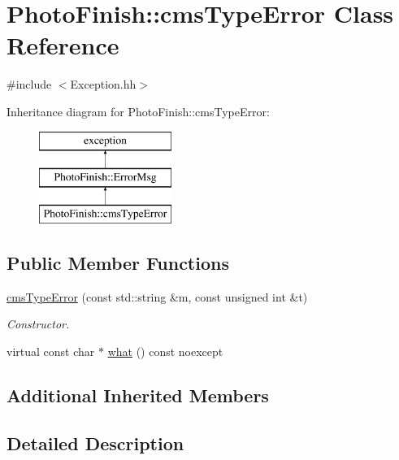 \hypertarget{class_photo_finish_1_1cms_type_error}{}\section{Photo\+Finish\+:\+:cms\+Type\+Error Class Reference}
\label{class_photo_finish_1_1cms_type_error}


{\ttfamily \#include $<$Exception.\+hh$>$}

Inheritance diagram for Photo\+Finish\+:\+:cms\+Type\+Error\+:\begin{figure}[H]
\begin{center}
\leavevmode
\includegraphics[height=3.000000cm]{class_photo_finish_1_1cms_type_error}
\end{center}
\end{figure}
\subsection*{Public Member Functions}
\begin{DoxyCompactItemize}
\item 
\hyperlink{class_photo_finish_1_1cms_type_error_a6f4392869288e257455f8298f881146c}{cms\+Type\+Error} (const std\+::string \&m, const unsigned int \&t)
\begin{DoxyCompactList}\small\item\em Constructor. \end{DoxyCompactList}\item 
virtual const char $\ast$ \hyperlink{class_photo_finish_1_1cms_type_error_adac46d245427925e3984a551bee3e1b4}{what} () const noexcept
\end{DoxyCompactItemize}
\subsection*{Additional Inherited Members}


\subsection{Detailed Description}


